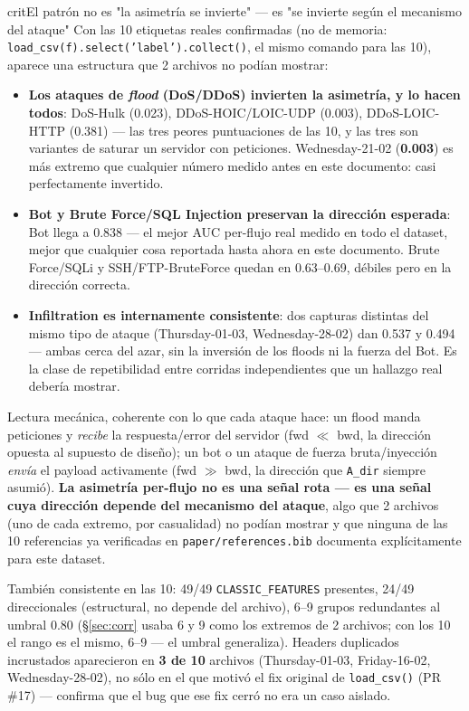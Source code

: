 \documentclass[11pt]{article}
\newcommand{\code}[1]{\texttt{\small #1}}
\begin{document}
\begin{cbox}{crit}{El patrón no es "la asimetría se invierte" --- es "se invierte según el mecanismo del ataque"}
Con las 10 etiquetas reales confirmadas (no de memoria: \code{load\_csv(f).select('label').collect()},
el mismo comando para las 10), aparece una estructura que 2 archivos no podían mostrar:

\begin{itemize}[leftmargin=1.4em,itemsep=2pt]
\item \textbf{Los ataques de \emph{flood} (DoS/DDoS) invierten la asimetría, y lo hacen todos}: DoS-Hulk
  (0.023), DDoS-HOIC/LOIC-UDP (0.003), DDoS-LOIC-HTTP (0.381) --- las tres peores puntuaciones de
  las 10, y las tres son variantes de saturar un servidor con peticiones. Wednesday-21-02
  (\textbf{0.003}) es más extremo que cualquier número medido antes en este documento: casi
  perfectamente invertido.
\item \textbf{Bot y Brute Force/SQL Injection preservan la dirección esperada}: Bot llega a 0.838 ---
  el mejor AUC per-flujo real medido en todo el dataset, mejor que cualquier cosa reportada hasta
  ahora en este documento. Brute Force/SQLi y SSH/FTP-BruteForce quedan en 0.63--0.69, débiles pero
  en la dirección correcta.
\item \textbf{Infiltration es internamente consistente}: dos capturas distintas del mismo tipo de
  ataque (Thursday-01-03, Wednesday-28-02) dan 0.537 y 0.494 --- ambas cerca del azar, sin la
  inversión de los floods ni la fuerza del Bot. Es la clase de repetibilidad entre corridas
  independientes que un hallazgo real debería mostrar.
\end{itemize}

Lectura mecánica, coherente con lo que cada ataque hace: un flood manda peticiones y \emph{recibe}
la respuesta/error del servidor (fwd $\ll$ bwd, la dirección opuesta al supuesto de diseño); un bot
o un ataque de fuerza bruta/inyección \emph{envía} el payload activamente (fwd $\gg$ bwd, la
dirección que \code{A\_dir} siempre asumió). \textbf{La asimetría per-flujo no es una señal rota ---
es una señal cuya dirección depende del mecanismo del ataque}, algo que 2 archivos (uno de cada
extremo, por casualidad) no podían mostrar y que ninguna de las 10 referencias ya verificadas en
\code{paper/references.bib} documenta explícitamente para este dataset.
\end{cbox}

También consistente en las 10: 49/49 \code{CLASSIC\_FEATURES} presentes, 24/49 direccionales
(estructural, no depende del archivo), 6--9 grupos redundantes al umbral 0.80
(\S\ref{sec:corr} usaba 6 y 9 como los extremos de 2 archivos; con los 10 el rango es el mismo,
6--9 --- el umbral generaliza). Headers duplicados incrustados aparecieron en \textbf{3 de 10}
archivos (Thursday-01-03, Friday-16-02, Wednesday-28-02), no sólo en el que motivó el fix original
de \code{load\_csv()} (PR \#17) --- confirma que el bug que ese fix cerró no era un caso aislado.
\end{document}
